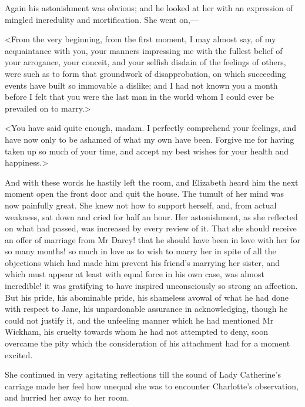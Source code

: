 Again his astonishment was obvious; and he looked at her with an expression of mingled incredulity and mortification. She went on,—

<From the very beginning, from the first moment, I may almost say, of my acquaintance with you, your manners impressing me with the fullest belief of your arrogance, your conceit, and your selfish disdain of the feelings of others, were such as to form that groundwork of disapprobation, on which succeeding events have built so immovable a dislike; and I had not known you a month before I felt that you were the last man in the world whom I could ever be prevailed on to marry.>

<You have said quite enough, madam. I perfectly comprehend your feelings, and have now only to be ashamed of what my own have been. Forgive me for having taken up so much of your time, and accept my best wishes for your health and happiness.>

And with these words he hastily left the room, and Elizabeth heard him the next moment open the front door and quit the house. The tumult of her mind was now painfully great. She knew not how to support herself, and, from actual weakness, sat down and cried for half an hour. Her astonishment, as she reflected on what had passed, was increased by every review of it. That she should receive an offer of marriage from Mr Darcy! that he should have been in love with her for so many months! so much in love as to wish to marry her in spite of all the objections which had made him prevent his friend's marrying her sister, and which must appear at least with equal force in his own case, was almost incredible! it was gratifying to have inspired unconsciously so strong an affection. But his pride, his abominable pride, his shameless avowal of what he had done with respect to Jane, his unpardonable assurance in acknowledging, though he could not justify it, and the unfeeling manner which he had mentioned Mr Wickham, his cruelty towards whom he had not attempted to deny, soon overcame the pity which the consideration of his attachment had for a moment excited.

She continued in very agitating reflections till the sound of Lady Catherine's carriage made her feel how unequal she was to encounter Charlotte's observation, and hurried her away to her room.